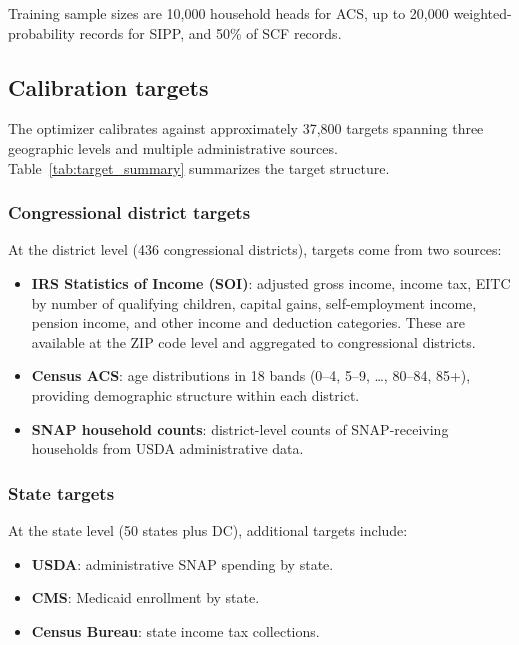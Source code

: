 Training sample sizes are 10,000 household heads for ACS, up to 20,000 weighted-probability records for SIPP, and 50\% of SCF records.

\subsection{Calibration targets}

The optimizer calibrates against approximately 37,800 targets spanning three geographic levels and multiple administrative sources. Table~\ref{tab:target_summary} summarizes the target structure.



\subsubsection{Congressional district targets}

At the district level (436 congressional districts), targets come from two sources:

\begin{itemize}
    \item \textbf{IRS Statistics of Income (SOI)}: adjusted gross income, income tax, EITC by number of qualifying children, capital gains, self-employment income, pension income, and other income and deduction categories. These are available at the ZIP code level and aggregated to congressional districts.
    \item \textbf{Census ACS}: age distributions in 18 bands (0--4, 5--9, \ldots, 80--84, 85+), providing demographic structure within each district.
    \item \textbf{SNAP household counts}: district-level counts of SNAP-receiving households from USDA administrative data.
\end{itemize}

\subsubsection{State targets}

At the state level (50 states plus DC), additional targets include:

\begin{itemize}
    \item \textbf{USDA}: administrative SNAP spending by state.
    \item \textbf{CMS}: Medicaid enrollment by state.
    \item \textbf{Census Bureau}: state income tax collections.
\end{itemize}

